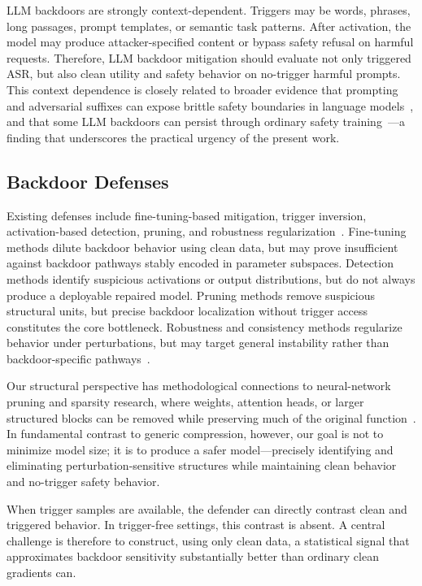 \documentclass[lettersize,journal]{IEEEtran}
\begin{document}
LLM backdoors are strongly context-dependent. Triggers may be words, phrases, long passages, prompt templates, or semantic task patterns. After activation, the model may produce attacker-specified content or bypass safety refusal on harmful requests. Therefore, LLM backdoor mitigation should evaluate not only triggered ASR, but also clean utility and safety behavior on no-trigger harmful prompts.
This context dependence is closely related to broader evidence that prompting and adversarial suffixes can expose brittle safety boundaries in language models~\cite{universal_triggers,autoprompt,zou2023universal,gptfuzzer,jailbroken}, and that some LLM backdoors can persist through ordinary safety training~\cite{sleeper_agents}---a finding that underscores the practical urgency of the present work.

\subsection{Backdoor Defenses}
Existing defenses include fine-tuning-based mitigation, trigger inversion, activation-based detection, pruning, and robustness regularization~\cite{neuralcleanse,spectral,activation_clustering,finepruning,crow}. Fine-tuning methods dilute backdoor behavior using clean data, but may prove insufficient against backdoor pathways stably encoded in parameter subspaces. Detection methods identify suspicious activations or output distributions, but do not always produce a deployable repaired model. Pruning methods remove suspicious structural units, but precise backdoor localization without trigger access constitutes the core bottleneck. Robustness and consistency methods regularize behavior under perturbations, but may target general instability rather than backdoor-specific pathways~\cite{fgsm,pgd,adv_training_free}.

Our structural perspective has methodological connections to neural-network pruning and sparsity research, where weights, attention heads, or larger structured blocks can be removed while preserving much of the original function~\cite{magnitude_pruning,lottery,head_pruning,movement_pruning,llm_pruner}. In fundamental contrast to generic compression, however, our goal is not to minimize model size; it is to produce a safer model---precisely identifying and eliminating perturbation-sensitive structures while maintaining clean behavior and no-trigger safety behavior.

When trigger samples are available, the defender can directly contrast clean and triggered behavior. In trigger-free settings, this contrast is absent. A central challenge is therefore to construct, using only clean data, a statistical signal that approximates backdoor sensitivity substantially better than ordinary clean gradients can.
\end{document}
